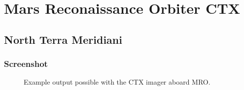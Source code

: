 \section{Mars Reconaissance Orbiter CTX}

\subsection{North Terra Meridiani}

\subsubsection*{Screenshot}

\begin{figure}[h!]
\centering
  \hfil
\caption{Example output possible with the CTX imager aboard MRO.}
\label{fig:ctx_example}
\end{figure}

